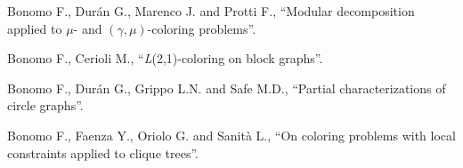 \item Bonomo F., Dur\'an G., Marenco J. and Protti F., ``Modular
decomposition applied to $\mu$- and $(\gamma,\mu)$-coloring
problems''.

\item Bonomo F., Cerioli M., ``\textit{L}(2,1)-coloring on block
graphs''.

\item Bonomo F., Dur\'an G., Grippo L.N. and Safe M.D., ``Partial
characterizations of circle graphs''.

\item Bonomo F., Faenza Y., Oriolo G. and Sanit\`a L., ``On
coloring problems with local constraints applied to clique
trees''.
